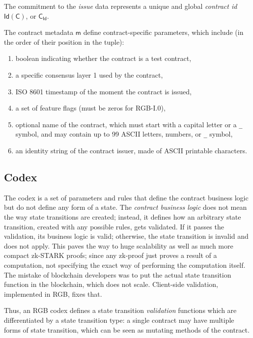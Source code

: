 \documentclass[9pt,oneside]{amsart}
\begin{document}
\begin{multicols}{2}

The commitment to the \emph{issue} data represents a unique and global \emph{contract id}
$\mathsf{Id}(\mathsf{C})$, or $\mathsf{C_{Id}}$.

The contract metadata $\mathsf{m}$ define contract-specific parameters, which include
(in the order of their position in the tuple):

\begin{enumerate}
\item boolean indicating whether the contract is a test contract,
\item a specific consensus layer 1 used by the contract,
\item ISO 8601 timestamp of the moment the contract is issued,
\item a set of feature flags (must be zeros for RGB-I.0),
\item optional name of the contract, which must start with a capital letter or a \texttt{\_} symbol,
  and may contain up to 99 ASCII letters, numbers, or \texttt{\_} symbol,
\item an identity string of the contract issuer, made of ASCII printable characters.
\end{enumerate}

\subsection{Codex}\label{Codex}


The codex is a set of parameters and rules that define the contract business logic
but do not define any form of a state. The \emph{contract business logic} does not mean
the way state transitions are created; instead, it defines how an arbitrary
state transition, created with any possible rules, gets validated. If it passes the validation,
its business logic is valid; otherwise, the state transition is invalid and does not apply.
This paves the way to huge scalability as well as much more compact zk-STARK proofs;
since any zk-proof just proves a result of a computation,
not specifying the exact way of performing the computation itself.
The mistake of blockchain developers was to put the actual state transition function in
the blockchain, which does not scale. Client-side validation, implemented in RGB, fixes that.

Thus, an RGB codex defines a state transition \emph{validation} functions
which are differentiated by a state transition type:
a single contract may have multiple forms of state transition,
which can be seen as mutating methods of the contract.


\end{multicols}
\end{document}

